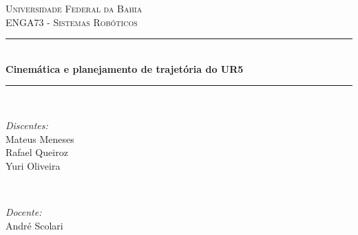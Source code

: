 \begin{titlepage}

\newcommand{\HRule}{\rule{\linewidth}{0.5mm}} %

\center %
 

\textsc{\LARGE Universidade Federal da Bahia}\\[1.5cm] 
\textsc{\Large ENGA73 - Sistemas Robóticos}\\[0.5cm] 


\HRule \\[0.4cm]
{ \huge \bfseries Cinemática e planejamento de trajetória do UR5}\\[0.4cm] %
\HRule \\[1.5cm]
 

\begin{minipage}{0.4\textwidth}
\begin{flushleft} \large
\emph{Discentes:} \\
{\normalsize
\hspace{1em} Mateus Meneses \\
\hspace{1em} Rafael Queiroz \\
\hspace{1em} Yuri Oliveira}
\end{flushleft}
\end{minipage}
~
\begin{minipage}{0.4\textwidth}
\begin{flushright} \large
\emph{Docente:} \\
André Scolari
\end{flushright}
\end{minipage}\\[2cm]


\end{titlepage}
